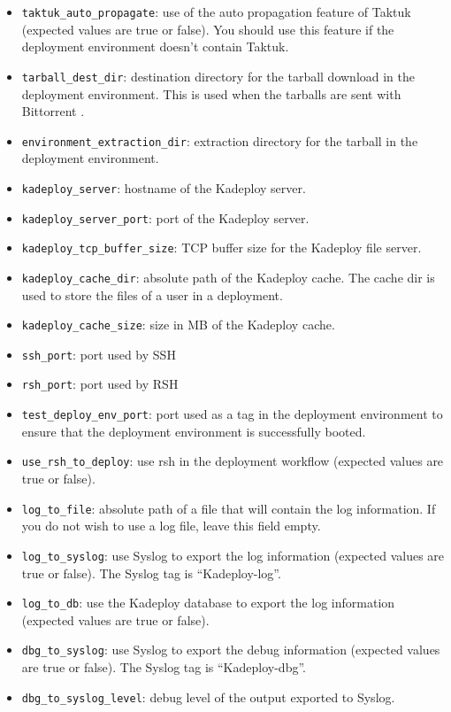 \documentclass[a4wide,10pt,oneside]{book}
\begin{document}
\begin{itemize}
\item \texttt{taktuk\_auto\_propagate}: use of the auto propagation feature of Taktuk (expected values are true or false). You should use this feature if the deployment environment doesn't contain Taktuk.
\item \texttt{tarball\_dest\_dir}: destination directory for the tarball download in the deployment environment. This is used when the tarballs are sent with Bittorrent .
\item \texttt{environment\_extraction\_dir}: extraction directory for the tarball in the deployment environment.
\item \texttt{kadeploy\_server}: hostname of the Kadeploy server.
\item \texttt{kadeploy\_server\_port}: port of the Kadeploy server.
\item \texttt{kadeploy\_tcp\_buffer\_size}: TCP buffer size for the Kadeploy file server.
\item \texttt{kadeploy\_cache\_dir}: absolute path of the Kadeploy cache. The cache dir is used to store the files of a user in a deployment.
\item \texttt{kadeploy\_cache\_size}: size in MB of the Kadeploy cache.
\item \texttt{ssh\_port}: port used by SSH
\item \texttt{rsh\_port}: port used by RSH
\item \texttt{test\_deploy\_env\_port}: port used as a tag in the deployment environment to ensure that the deployment environment is successfully booted.
\item \texttt{use\_rsh\_to\_deploy}: use rsh in the deployment workflow (expected values are true or false).
\item \texttt{log\_to\_file}: absolute path of a file that will contain the log information. If you do not wish to use a log file, leave this field empty.
\item \texttt{log\_to\_syslog}: use Syslog to export the log information (expected values are true or false). The Syslog tag is ``Kadeploy-log''.
\item \texttt{log\_to\_db}: use the Kadeploy database to export the log information (expected values are true or false).
\item \texttt{dbg\_to\_syslog}: use Syslog to export the debug information (expected values are true or false). The Syslog tag is ``Kadeploy-dbg''.
\item \texttt{dbg\_to\_syslog\_level}: debug level of the output exported to Syslog.

\end{itemize}
\end{document}
